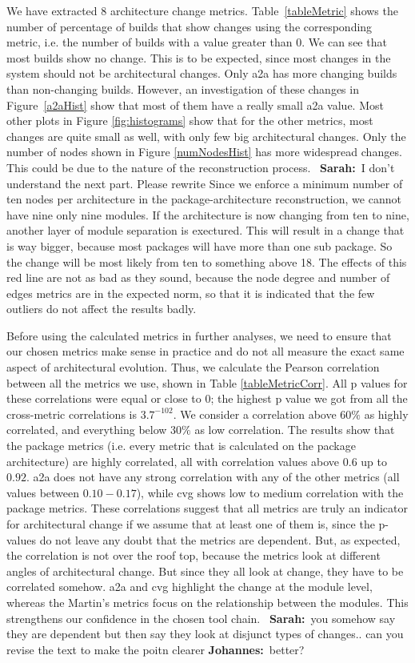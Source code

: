 \documentclass[sigplan, anonymous, review]{acmart}
\newcommand{\sn}[1]{{\color{blue}\textbf{Sarah:}~#1}}
\newcommand{\jk}[1]{{\color{violet}\textbf{Johannes:}~#1}}
\begin{document}
We have extracted 8 architecture change metrics. 
Table~\ref{tableMetric} shows the number of percentage of builds that show changes using the corresponding metric, i.e. the number of builds with a value greater than 0.
We can see that most builds show no change.
This is to be expected, since most changes in the system should not be architectural changes. 
Only a2a has more changing builds than non-changing builds. 
However, an investigation of these changes in Figure~\ref{a2aHist} show that most of them have a really small a2a value. 
Most other plots in Figure \ref{fig:histograms} show that for the other metrics, most changes are quite small as well, with only few big architectural changes. 
Only the number of nodes shown in Figure \ref{numNodesHist} has more widespread changes.
This could be due to the nature of the reconstruction process. ~\sn{I don't understand the next part. Please rewrite} Since we enforce a minimum number of ten nodes per architecture in the package-architecture reconstruction, we cannot have nine only nine modules. If the architecture is now changing from ten to nine, another layer of module separation is exectured. This will result in a change that is way bigger, because most packages will have more than one sub package. So the change will be most likely from ten to something above 18. The effects of this red line are not as bad as they sound, because the node degree and number of edges metrics are in the expected norm, so that it is indicated that the few outliers do not affect the results badly.

Before using the calculated metrics in further analyses, we need to ensure that our chosen metrics make sense in practice and do not all measure the exact same aspect of architectural evolution. Thus, we calculate the Pearson correlation between all the metrics we use, shown in Table \ref{tableMetricCorr}. All p values for these correlations were equal or close to 0; the highest p value we got from all the cross-metric correlations is $3.7^{-102}$. 
We consider a correlation above $60\%$ as highly correlated, and everything below $30\%$ as low correlation.
The results show that the package metrics (i.e. every metric that is calculated on the package architecture) are highly correlated, all with correlation values above $0.6$ up to $0.92$. a2a does not have any strong correlation with any of the other metrics (all values between $0.10-0.17$), while cvg shows low to medium correlation with the package metrics. 
These correlations suggest that all metrics are truly an indicator for architectural change if we assume that at least one of them is, since the p-values do not leave any doubt that the metrics are dependent.
But, as expected, the correlation is not over the roof top, because the metrics look at different angles of architectural change. But since they all look at change, they have to be correlated somehow. 
a2a and cvg highlight the change at the module level, whereas the Martin's metrics focus on the relationship between the modules. This strengthens our confidence in the chosen tool chain. ~\sn{you somehow say they are dependent but then say they look at disjunct types of changes.. can you revise the text to make the poitn clearer} \jk{better?}
\end{document}

